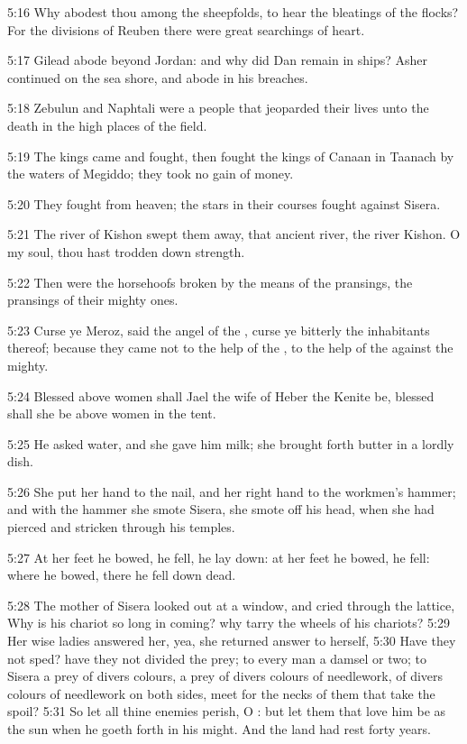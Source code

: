 5:16 Why abodest thou among the sheepfolds, to hear the bleatings of
the flocks? For the divisions of Reuben there were great searchings of
heart.

5:17 Gilead abode beyond Jordan: and why did Dan remain in ships?
Asher continued on the sea shore, and abode in his breaches.

5:18 Zebulun and Naphtali were a people that jeoparded their lives
unto the death in the high places of the field.

5:19 The kings came and fought, then fought the kings of Canaan in
Taanach by the waters of Megiddo; they took no gain of money.

5:20 They fought from heaven; the stars in their courses fought
against Sisera.

5:21 The river of Kishon swept them away, that ancient river, the
river Kishon. O my soul, thou hast trodden down strength.

5:22 Then were the horsehoofs broken by the means of the pransings,
the pransings of their mighty ones.

5:23 Curse ye Meroz, said the angel of the \LORD, curse ye bitterly the
inhabitants thereof; because they came not to the help of the \LORD, to
the help of the \LORD against the mighty.

5:24 Blessed above women shall Jael the wife of Heber the Kenite be,
blessed shall she be above women in the tent.

5:25 He asked water, and she gave him milk; she brought forth butter
in a lordly dish.

5:26 She put her hand to the nail, and her right hand to the workmen's
hammer; and with the hammer she smote Sisera, she smote off his head,
when she had pierced and stricken through his temples.

5:27 At her feet he bowed, he fell, he lay down: at her feet he bowed,
he fell: where he bowed, there he fell down dead.

5:28 The mother of Sisera looked out at a window, and cried through
the lattice, Why is his chariot so long in coming? why tarry the
wheels of his chariots?  5:29 Her wise ladies answered her, yea, she
returned answer to herself, 5:30 Have they not sped? have they not
divided the prey; to every man a damsel or two; to Sisera a prey of
divers colours, a prey of divers colours of needlework, of divers
colours of needlework on both sides, meet for the necks of them that
take the spoil?  5:31 So let all thine enemies perish, O \LORD: but let
them that love him be as the sun when he goeth forth in his might. And
the land had rest forty years.

